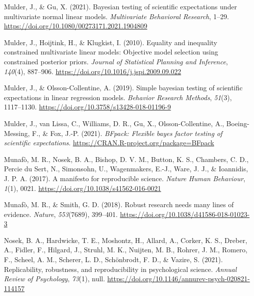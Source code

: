 \documentclass[
]{interact}
\newlength{\cslhangindent}
\newlength{\cslentryspacingunit} %
\newenvironment{CSLReferences}[2] %
 {%
  \setlength{\parindent}{0pt}
  \ifodd #1
  \let\oldpar\par
  \def\par{\hangindent=\cslhangindent\oldpar}
  \fi
  \setlength{\parskip}{#2\cslentryspacingunit}
 }%
 {}
\begin{document}
\begin{CSLReferences}{1}{0}
\leavevmode{}%
Mulder, J., \& Gu, X. (2021). Bayesian testing of scientific
expectations under multivariate normal linear models. \emph{Multivariate
Behavioral Research}, 1--29.
\url{https://doi.org/10.1080/00273171.2021.1904809}

\leavevmode{}%
Mulder, J., Hoijtink, H., \& Klugkist, I. (2010). Equality and
inequality constrained multivariate linear models: Objective model
selection using constrained posterior priors. \emph{Journal of
Statistical Planning and Inference}, \emph{140}(4), 887--906.
\url{https://doi.org/10.1016/j.jspi.2009.09.022}

\leavevmode{}%
Mulder, J., \& Olsson-Collentine, A. (2019). Simple bayesian testing of
scientific expectations in linear regression models. \emph{Behavior
Research Methods}, \emph{51}(3), 1117--1130.
\url{https://doi.org/10.3758/s13428-018-01196-9}

\leavevmode{}%
Mulder, J., van Lissa, C., Williams, D. R., Gu, X., Olsson-Collentine,
A., Boeing-Messing, F., \& Fox, J.-P. (2021). \emph{BFpack: Flexible
bayes factor testing of scientific expectations}.
\url{https://CRAN.R-project.org/package=BFpack}

\leavevmode{}%
Munafò, M. R., Nosek, B. A., Bishop, D. V. M., Button, K. S., Chambers,
C. D., Percie du Sert, N., Simonsohn, U., Wagenmakers, E.-J., Ware, J.
J., \& Ioannidis, J. P. A. (2017). A manifesto for reproducible science.
\emph{Nature Human Behaviour}, \emph{1}(1), 0021.
\url{https://doi.org/10.1038/s41562-016-0021}

\leavevmode{}%
Munafò, M. R., \& Smith, G. D. (2018). Robust research needs many lines
of evidence. \emph{Nature}, \emph{553}(7689), 399--401.
\url{https://doi.org/10.1038/d41586-018-01023-3}

\leavevmode{}%
Nosek, B. A., Hardwicke, T. E., Moshontz, H., Allard, A., Corker, K. S.,
Dreber, A., Fidler, F., Hilgard, J., Struhl, M. K., Nuijten, M. B.,
Rohrer, J. M., Romero, F., Scheel, A. M., Scherer, L. D., Schönbrodt, F.
D., \& Vazire, S. (2021). Replicability, robustness, and reproducibility
in psychological science. \emph{Annual Review of Psychology},
\emph{73}(1), null.
\url{https://doi.org/10.1146/annurev-psych-020821-114157}


\end{CSLReferences}
\end{document}
